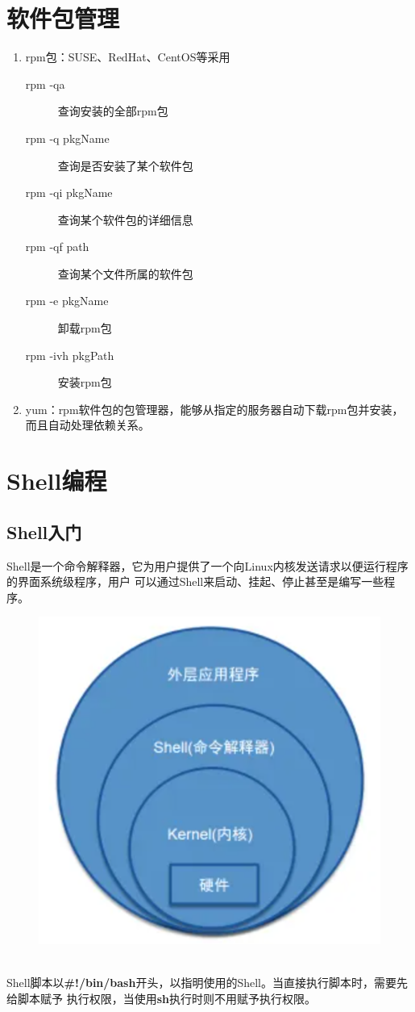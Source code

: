 \documentclass[11pt]{article}
\begin{document}
\section{软件包管理}
\begin{enumerate}
    \item rpm包：SUSE、RedHat、CentOS等采用
    \begin{description}
        \item[rpm -qa] 查询安装的全部rpm包
        \item[rpm -q pkgName] 查询是否安装了某个软件包
        \item[rpm -qi pkgName] 查询某个软件包的详细信息
        \item[rpm -qf path] 查询某个文件所属的软件包
        \item[rpm -e pkgName] 卸载rpm包
        \item[rpm -ivh pkgPath] 安装rpm包
    \end{description}
    \item yum：rpm软件包的包管理器，能够从指定的服务器自动下载rpm包并安装，而且自动处理依赖关系。
\end{enumerate}

\section{Shell编程}
\subsection{Shell入门}
Shell是一个命令解释器，它为用户提供了一个向Linux内核发送请求以便运行程序的界面系统级程序，用户
可以通过Shell来启动、挂起、停止甚至是编写一些程序。
\begin{figure}[htb]
    \centering
    \includegraphics[scale=0.3]{imgs/shell.png}
\end{figure}  \\
Shell脚本以\textbf{\#!/bin/bash}开头，以指明使用的Shell。当直接执行脚本时，需要先给脚本赋予
执行权限，当使用\textbf{sh}执行时则不用赋予执行权限。
\end{document}
